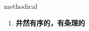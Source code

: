 
\begin{frame}
{\huge methodical}
\begin{center}
\begin{enumerate}\Large
  \item \textbf{井然有序的，有条理的}
\end{enumerate}
\end{center}
\end{frame}
